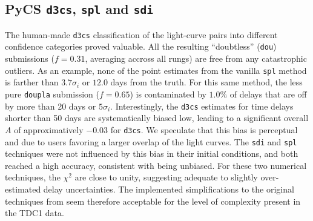 \documentclass[traditabstract]{aa}
\begin{document}
\subsection{PyCS {\tt d3cs}, {\tt spl} and {\tt sdi}}

The human-made {\tt d3cs} classification of the light-curve pairs into different confidence categories proved valuable. All the resulting ``doubtless'' ({\tt dou}) submissions ($f=0.31$, averaging accross all rungs) are free from any catastrophic outliers. As an example, none of the point estimates from the vanilla {\tt spl} method is farther than $3.7 \sigma_i$ or $12.0$ days from the truth. For this same method, the less pure {\tt doupla} submission ($f=0.65$) is contaminated by $1.0\%$ of delays that are off by more than 20 days or $5 \sigma_i$. Interestingly, the {\tt d3cs} estimates for time delays shorter than 50 days are systematically biased low, leading to a significant overall $A$ of approximatively $-0.03$ for {\tt d3cs}. We speculate that this bias is perceptual and due to users favoring a larger overlap of the light curves. The {\tt sdi} and {\tt spl} techniques were not influenced by this bias in their initial conditions, and both reached a high accuracy, consistent with being unbiased. For these two numerical techniques, the $\chi^2$ are close to unity, suggesting adequate to slightly over-estimated delay uncertainties. The implemented simplifications to the original techniques from \citet{pycs} seem therefore  acceptable for the level of complexity present in the TDC1 data.











\end{document}
